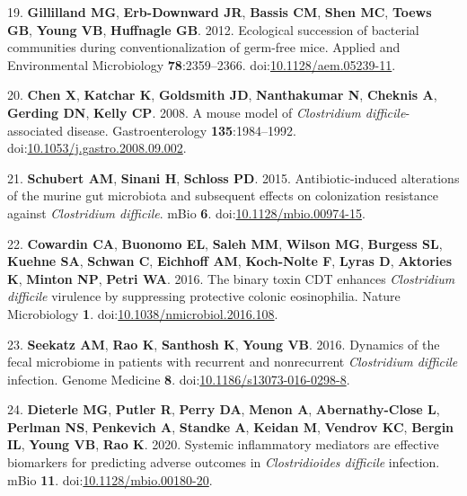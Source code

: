 \documentclass[
  12pt,
]{article}
\newenvironment{cslreferences}%
  {}%
  {\par}
\begin{document}
\begin{cslreferences}
\leavevmode\hypertarget{ref-Gillilland2012}{}%
19. \textbf{Gillilland MG}, \textbf{Erb-Downward JR}, \textbf{Bassis
CM}, \textbf{Shen MC}, \textbf{Toews GB}, \textbf{Young VB},
\textbf{Huffnagle GB}. 2012. Ecological succession of bacterial
communities during conventionalization of germ-free mice. Applied and
Environmental Microbiology \textbf{78}:2359--2366.
doi:\href{https://doi.org/10.1128/aem.05239-11}{10.1128/aem.05239-11}.

\leavevmode\hypertarget{ref-Chen2008}{}%
20. \textbf{Chen X}, \textbf{Katchar K}, \textbf{Goldsmith JD},
\textbf{Nanthakumar N}, \textbf{Cheknis A}, \textbf{Gerding DN},
\textbf{Kelly CP}. 2008. A mouse model of \emph{Clostridium
difficile}-associated disease. Gastroenterology \textbf{135}:1984--1992.
doi:\href{https://doi.org/10.1053/j.gastro.2008.09.002}{10.1053/j.gastro.2008.09.002}.

\leavevmode\hypertarget{ref-Schubert2015}{}%
21. \textbf{Schubert AM}, \textbf{Sinani H}, \textbf{Schloss PD}. 2015.
Antibiotic-induced alterations of the murine gut microbiota and
subsequent effects on colonization resistance against \emph{Clostridium
difficile}. mBio \textbf{6}.
doi:\href{https://doi.org/10.1128/mbio.00974-15}{10.1128/mbio.00974-15}.

\leavevmode\hypertarget{ref-Cowardin2016}{}%
22. \textbf{Cowardin CA}, \textbf{Buonomo EL}, \textbf{Saleh MM},
\textbf{Wilson MG}, \textbf{Burgess SL}, \textbf{Kuehne SA},
\textbf{Schwan C}, \textbf{Eichhoff AM}, \textbf{Koch-Nolte F},
\textbf{Lyras D}, \textbf{Aktories K}, \textbf{Minton NP}, \textbf{Petri
WA}. 2016. The binary toxin CDT enhances \emph{Clostridium difficile}
virulence by suppressing protective colonic eosinophilia. Nature
Microbiology \textbf{1}.
doi:\href{https://doi.org/10.1038/nmicrobiol.2016.108}{10.1038/nmicrobiol.2016.108}.

\leavevmode\hypertarget{ref-Seekatz2016}{}%
23. \textbf{Seekatz AM}, \textbf{Rao K}, \textbf{Santhosh K},
\textbf{Young VB}. 2016. Dynamics of the fecal microbiome in patients
with recurrent and nonrecurrent \emph{Clostridium difficile} infection.
Genome Medicine \textbf{8}.
doi:\href{https://doi.org/10.1186/s13073-016-0298-8}{10.1186/s13073-016-0298-8}.

\leavevmode\hypertarget{ref-Dieterle2020}{}%
24. \textbf{Dieterle MG}, \textbf{Putler R}, \textbf{Perry DA},
\textbf{Menon A}, \textbf{Abernathy-Close L}, \textbf{Perlman NS},
\textbf{Penkevich A}, \textbf{Standke A}, \textbf{Keidan M},
\textbf{Vendrov KC}, \textbf{Bergin IL}, \textbf{Young VB}, \textbf{Rao
K}. 2020. Systemic inflammatory mediators are effective biomarkers for
predicting adverse outcomes in \emph{Clostridioides difficile}
infection. mBio \textbf{11}.
doi:\href{https://doi.org/10.1128/mbio.00180-20}{10.1128/mbio.00180-20}.


\end{cslreferences}
\end{document}
